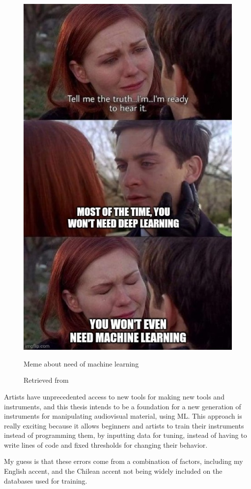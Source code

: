 \begin{figure}[ht]
  \centering
  \includegraphics[width=0.75\linewidth,height=0.40\textheight,keepaspectratio]{images/meme-spider-man.jpg}
  \caption{Meme about need of machine learning}
  \caption*{Retrieved from \cite{website-twitter-dynamicwebpaige-meme}}
  \label{fig:meme-spider-man}
\end{figure}

Artists have unprecedented access to new tools for making new tools and instruments, and this thesis intends to be a foundation for a new generation of instruments for manipulating audiovisual material, using \acrshort{ML}. This approach is really exciting because it allows beginners and artists to train their instruments instead of programming them, by inputting data for tuning, instead of having to write lines of code and fixed thresholds for changing their behavior.

My guess is that these errors come from a combination of factors, including my English accent, and the Chilean accent not being widely included on the databases used for training.

